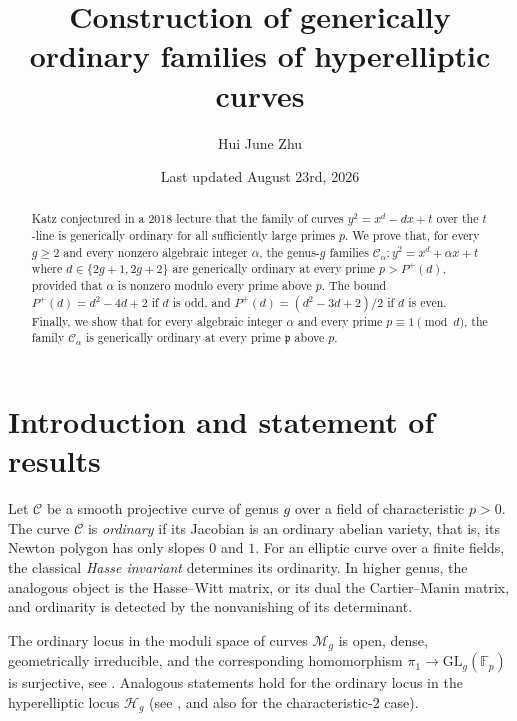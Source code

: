 \documentclass{amsart}
\theoremstyle{plain}
\theoremstyle{remark}
\theoremstyle{remark}
\newcommand{\fp}{\mathfrak{p}}
\newcommand{\cH}{\mathcal{H}}
\newcommand{\cC}{\mathcal{C}}
\newcommand{\cM}{\mathcal{M}}
\newcommand{\GL}{\mathrm{GL}}
\newcommand{\0}{\mathbf{0}}
\newcommand{\1}{\mathbf{1}}
\newcommand{\F}{\mathbb{F}}
\begin{document}
\title[Generically ordinary hyperelliptic families]{Construction of generically ordinary families of hyperelliptic curves}


\author{Hui June Zhu}

\address{
Department of Mathematics,
University at Buffalo, 
State University of New York,
Buffalo, NY 14260, USA}

\date{Last updated August 23rd, 2026}

\begin{abstract}
Katz conjectured in a 2018 lecture 
that the family of curves $y^2=x^d-dx+t$ 
over the $t$-line 
is generically ordinary for all sufficiently large primes $p$. 
We prove that, for every $g\ge 2$ and every nonzero algebraic 
integer $\alpha$, 
the  genus-$g$ families 
$\cC_\alpha: y^2=x^d+\alpha x+t$ where $d\in\{2g+1, 2g+2\}$ 
are generically ordinary at every prime 
$p>P^+(d)$, provided that $\alpha$ is nonzero modulo every prime above $p$.
The bound $P^+(d)=d^2-4d+2$ if $d$ is odd, 
and $P^+(d)=(d^2-3d+2)/2$ if $d$ is even. 
Finally, we show that for every algebraic integer $\alpha$ and 
every prime $p\equiv 1\pmod d$, the family $\cC_\alpha$ is generically ordinary at every prime $\fp$ above $p$. 
\end{abstract}


\maketitle


\section{Introduction and statement of results}

Let $\cC$ be a smooth projective curve of genus $g$ over a field of
characteristic $p>0$.  
The curve 
$\cC$ is {\it ordinary} if its Jacobian is an ordinary 
abelian variety, that is, its  Newton polygon has
only slopes $0$ and $1$.
For an elliptic curve over a finite fields,
the classical {\em Hasse invariant} determines its ordinarity. 
In higher genus, the analogous object is the Hasse--Witt matrix, 
or its dual the
Cartier--Manin matrix, 
and ordinarity is detected by the nonvanishing of
its determinant. 

The ordinary locus in the moduli space of curves $\cM_g$ is
open, dense, geometrically irreducible, and the corresponding homomorphism 
$\pi_1\rightarrow 
\GL_g(\F_p)$ is surjective, see \cite{FG04,FC90}. 
Analogous statements hold for the ordinary locus in the hyperelliptic locus $\cH_g$ 
(see \cite{GP05,AP08}, and also \cite{PZ12} for the characteristic-$2$ case).
\end{document}
